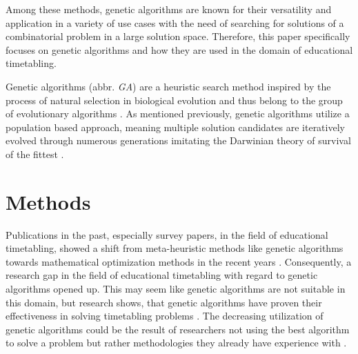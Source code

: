 \documentclass[sigconf]{acmart}
\begin{document}
Among these methods, genetic algorithms are known for their versatility and
application in a variety of use cases with the need of searching for solutions
of a combinatorial problem in a large solution space.
Therefore, this paper specifically focuses on genetic algorithms and how they
are used in the domain of educational timetabling.

Genetic algorithms (abbr. \textit{GA}) are a heuristic search method inspired by
the process of natural selection in biological evolution and thus belong to
the group of evolutionary algorithms \cite{Katoch2021}. As mentioned previously,
genetic algorithms utilize a population based approach, meaning multiple
solution candidates are iteratively evolved through numerous generations
imitating the Darwinian theory of survival of the fittest \cite{Katoch2021}.



\section{Methods}
Publications in the past, especially survey papers, in the field of educational
timetabling, showed a shift from meta-heuristic methods like genetic algorithms
towards mathematical optimization methods in the recent years
\cite{Tan2021}.
%
Consequently, a research gap in the field of educational timetabling
with regard to genetic algorithms opened up.
%
This may seem like genetic algorithms are not suitable in this domain,
but research shows, that genetic algorithms have proven their effectiveness
in solving timetabling problems \cite{Rezaeipanah2019,Chen2021}.
%
The decreasing utilization of genetic algorithms could be the result of
researchers not using the best algorithm to solve a problem but rather
methodologies they already have experience with \cite{Ceschia2023}.
\end{document}
